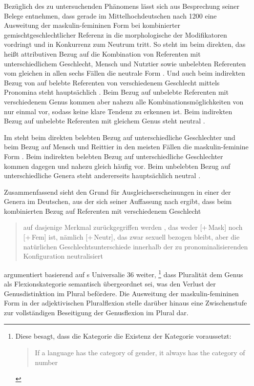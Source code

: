 Bezüglich des zu untersuchenden Phänomens lässt sich aus 
Besprechung seiner Belege entnehmen, dass gerade im
Mittelhochdeutschen nach 1200 eine Ausweitung der
maskulin-femininen Form bei kombinierter gemischt\-geschlechtlicher Referenz in
die morphologische  der Modifikatoren vordringt und
in Konkurrenz zum Neutrum tritt. So steht im
 beim direkten, das heißt attributiven Bezug auf die
Kombination von Referenten mit unterschiedlichem Geschlecht, Mensch und
Nutztier sowie unbelebten Referenten vom gleichen  in
allen sechs Fällen die neutrale Form . Und auch beim indirekten
Bezug von  auf belebte Referenten von verschiedenem
Geschlecht mittels Pronomina steht hauptsächlich . Beim Bezug
auf unbelebte Referenten mit verschiedenem Genus kommen aber nahezu alle
Kombinationsmöglichkeiten von  nur einmal vor,
sodass keine klare Tendenz zu erkennen ist. Beim indirekten Bezug auf unbelebte
Referenten mit gleichem Genus steht neutral 
\autocites[145--148, 158--161]{askedal1973}[nach][]{lachmannhartl1952}.

Im  steht beim direkten belebten Bezug auf
unterschiedliche Geschlechter und beim Bezug auf Mensch und Reittier in den
meisten Fällen die maskulin-feminine Form . Beim indirekten
belebten Bezug auf unterschiedliche Geschlechter kommen dagegen
 und  nahezu gleich häufig vor. Beim
unbelebten Bezug auf unterschiedliche Genera steht
andererseits hauptsächlich neutral  \autocites[95--99,
126--128]{askedal1973}[nach][]{maroldschroeder1969}.

Zusammenfassend sieht \citet[241--247]{askedal1973} den Grund für
Ausgleichserscheinungen in einer 
der Genera im Deutschen, aus der sich seiner Auffassung nach ergibt,
dass beim kombinierten Bezug auf Referenten mit verschiedenem Geschlecht
\blockcquote[253]{askedal1973}{auf dasjenige Merkmal zurückgegriffen werden
, das weder [+\,Mask] noch [+\,Fem] ist, nämlich [+\,Neutr], das
zwar sexuell bezogen bleibt, aber die natürlichen Geschlechts\-unterschiede
innerhalb der zu pronominalisierenden Konfiguration neutralisiert}.
\citet[173--177]{askedal1973} argumentiert basierend auf
\citeauthor{greenberg1966}s Universalie 36 weiter,%
%
	\footnote{Diese besagt, dass die Kategorie  die Existenz der
		Kategorie  voraussetzt:
		\foreignblockcquote{english}[112]{greenberg1966}{If a language has
		the category of gender, it always has the category of
		number}.%
	}
%
dass Pluralität dem Genus als Flexionskategorie semantisch übergeordnet sei,
was den Verlust der Genusdistinktion im Plural
befördere. Die Ausweitung der maskulin-femininen Form in der adjektivischen
Plural\-flexion stelle darüber hinaus eine
Zwischenstufe zur vollständigen Beseitigung der Genusflexion im Plural dar.

